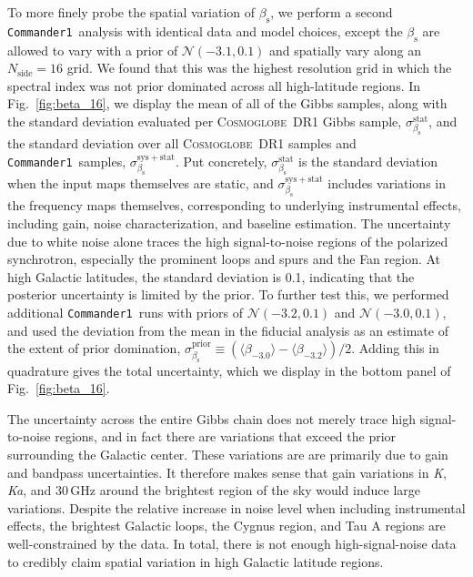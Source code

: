 \documentclass[twocolumn]{../../common/aa}
\def\commanderone{\texttt{Commander1}}
\newcommand{\cosmoglobe}{\textsc{Cosmoglobe}}
\newcommand{\K}[0]{\textit K}
\newcommand{\Ka}[0]{\textit{Ka}}
\begin{document}
To more finely probe the spatial variation of $\beta_\mathrm s$, we perform a second \commanderone\ analysis with identical data and model choices, except the $\beta_\mathrm s$ are allowed to vary with a prior of $\mathcal N(-3.1,0.1)$ and spatially vary along an $N_\mathrm{side}=16$ grid. We found that this was the highest resolution grid in which the spectral index was not prior dominated across all high-latitude regions. In Fig.~\ref{fig:beta_16}, we display the mean of all of the Gibbs samples, along with the standard deviation evaluated per \cosmoglobe\ DR1 Gibbs sample, $\sigma_{\beta_\mathrm s}^\mathrm{stat}$, and the standard deviation over all \cosmoglobe\ DR1 samples and \commanderone\ samples, $\sigma_{\beta_\mathrm s}^\mathrm{sys+stat}$. Put concretely, $\sigma_{\beta_\mathrm s}^\mathrm{stat}$ is the standard deviation when the input maps themselves are static, and $\sigma_{\beta_\mathrm s}^\mathrm{sys+stat}$ includes variations in the frequency maps themselves, corresponding to underlying instrumental effects, including gain, noise characterization, and baseline estimation. The uncertainty due to white noise alone  traces the high signal-to-noise regions of the polarized synchrotron, especially the prominent loops and spurs and the Fan region. At high Galactic latitudes, the standard deviation is 0.1, indicating that the posterior uncertainty is limited by the prior. To further test this, we performed additional \commanderone\ runs with priors of $\mathcal N(-3.2,0.1)$ and $\mathcal N(-3.0,0.1)$, and used the deviation from the mean in the fiducial analysis as an estimate of the extent of prior domination, $\sigma_{\beta_\mathrm s}^\mathrm{prior}\equiv (\langle \beta_{-3.0}\rangle-\langle\beta_{-3.2}\rangle)/2$. Adding this in quadrature gives the total uncertainty, which we display in the bottom panel of Fig.~\ref{fig:beta_16}.

The uncertainty across the entire Gibbs chain does not merely trace high signal-to-noise regions, and in fact there are variations that exceed the prior surrounding the Galactic center. These variations are are primarily due to gain and bandpass uncertainties. It therefore makes sense that gain variations in \K, \Ka, and 30\,GHz around the brightest region of the sky would induce large variations. Despite the relative increase in noise level when including instrumental effects, the brightest Galactic loops, the Cygnus region, and Tau A regions are well-constrained by the data.
In total, there is not enough high-signal-noise data to credibly claim spatial variation in high Galactic latitude regions. 
\end{document}
